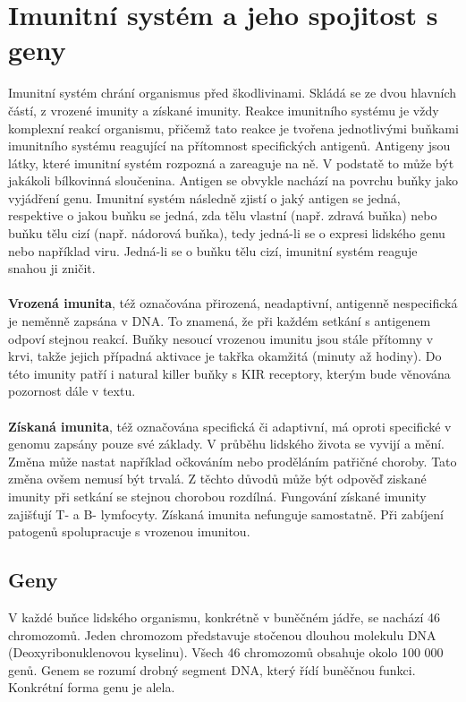 \documentclass[czech,DP]{thesiskiv}
\numberwithin{equation}{section}
\begin{document}
\chapter{Imunitní systém a jeho spojitost s geny}
Imunitní systém chrání organismus před škodlivinami. Skládá se ze dvou hlavních částí, z vrozené imunity a získané imunity. Reakce imunitního systému je vždy komplexní reakcí organismu, přičemž tato reakce je tvořena jednotlivými buňkami imunitního systému reagující na přítomnost specifických antigenů. Antigeny jsou látky, které imunitní systém rozpozná a zareaguje na ně. V podstatě to může být jakákoli bílkovinná sloučenina. Antigen se obvykle nachází na povrchu buňky jako vyjádření genu. Imunitní systém následně zjistí o jaký antigen se jedná, respektive o jakou buňku se jedná, zda tělu vlastní (např. zdravá buňka) nebo buňku tělu cizí (např. nádorová buňka), tedy jedná-li se o expresi lidského genu nebo například viru. Jedná-li se o buňku tělu cizí, imunitní systém reaguje snahou ji zničit. 
\\
\\
\textbf{Vrozená imunita}, též označována přirozená, neadaptivní, antigenně nespecifická je neměnně zapsána v DNA. To znamená, že při každém setkání s antigenem odpoví stejnou reakcí. Buňky nesoucí vrozenou imunitu jsou stále přítomny v krvi, takže jejich případná aktivace je takřka okamžitá (minuty až hodiny). Do této imunity patří i natural killer buňky s KIR receptory, kterým bude věnována pozornost dále v textu. 
\\
\\
\textbf{Získaná imunita}, též označována specifická či adaptivní, má oproti specifické v genomu zapsány pouze své základy. V průběhu lidského života se vyvijí a mění. Změna může nastat například očkováním nebo proděláním patřičné choroby. Tato změna ovšem nemusí být trvalá. Z těchto důvodů může být odpověď ziskané imunity při setkání se stejnou chorobou rozdílná. Fungování získané imunity zajišťují T- a B- lymfocyty. Získaná imunita nefunguje samostatně. Při zabíjení patogenů spolupracuje s vrozenou imunitou.

\section{Geny}
V každé buňce lidského organismu, konkrétně v buněčném jádře, se nachází 46 chromozomů. Jeden chromozom představuje stočenou dlouhou molekulu DNA (Deoxyribonuklenovou kyselinu). Všech 46 chromozomů obsahuje okolo 100 000 genů. Genem se rozumí drobný segment DNA, který řídí buněčnou funkci. Konkrétní forma genu je alela. \citep{en_smith}
\end{document}
